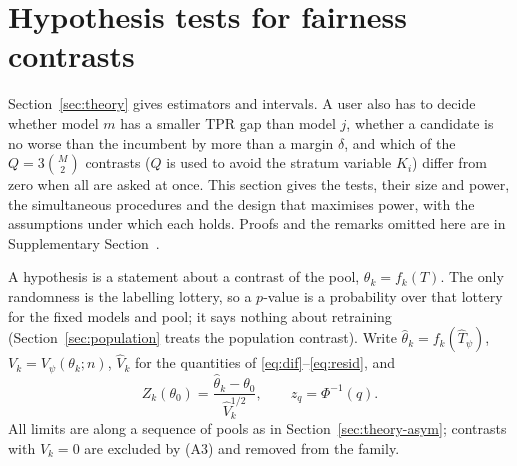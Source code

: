 \makeatletter
{}
\makeatother


\section{Hypothesis tests for fairness contrasts}\label{sec:testing}

Section~\ref{sec:theory} gives estimators and intervals. A user also has to decide whether model $m$ has a smaller TPR gap than model $j$, whether a candidate is no worse than the incumbent by more than a margin $\delta$, and which of the $Q=3\binom M2$ contrasts ($Q$ is used to avoid the stratum variable $K_i$) differ from zero when all are asked at once. This section gives the tests, their size and power, the simultaneous procedures and the design that maximises power, with the assumptions under which each holds. Proofs and the remarks omitted here are in Supplementary Section~.

A hypothesis is a statement about a contrast of the pool, $\theta_k=f_k(T)$. The only randomness is the labelling lottery, so a $p$-value is a probability over that lottery for the fixed models and pool; it says nothing about retraining (Section~\ref{sec:population} treats the population contrast). Write $\hat\theta_k=f_k(\hat T_\psi)$, $V_k=V_\psi(\theta_k;n)$, $\hat V_k$ for the quantities of \eqref{eq:dif}--\eqref{eq:resid}, and
\begin{equation}\label{eq:zstat}
Z_k(\theta_0)=\frac{\hat\theta_k-\theta_0}{\hat V_k^{1/2}},\qquad z_q=\Phi^{-1}(q).
\end{equation}
All limits are along a sequence of pools as in Section~\ref{sec:theory-asym}; contrasts with $V_k=0$ are excluded by (A3) and removed from the family.

